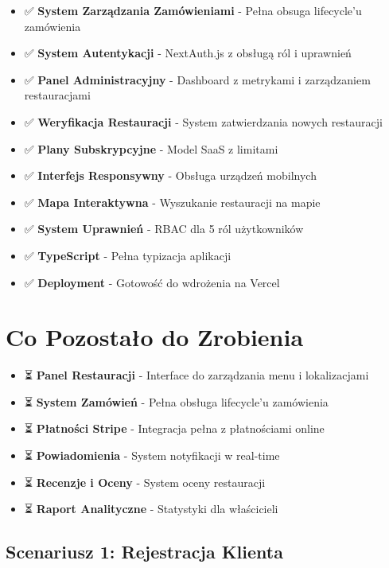 \documentclass[12pt,a4paper,utf-8]{article}
\begin{document}
\begin{itemize}
    \item ✅ \textbf{System Zarządzania Zamówieniami}  -  Pełna obsuga lifecycle'u zamówienia
    \item ✅ \textbf{System Autentykacji}  -  NextAuth.js z obsługą ról i uprawnień
    \item ✅ \textbf{Panel Administracyjny}  -  Dashboard z metrykami i zarządzaniem restauracjami
    \item ✅ \textbf{Weryfikacja Restauracji}  -  System zatwierdzania nowych restauracji
    \item ✅ \textbf{Plany Subskrypcyjne}  -  Model SaaS z limitami
    \item ✅ \textbf{Interfejs Responsywny}  -  Obsługa urządzeń mobilnych
    \item ✅ \textbf{Mapa Interaktywna}  -  Wyszukanie restauracji na mapie
    \item ✅ \textbf{System Uprawnień}  -  RBAC dla 5 ról użytkowników
    \item ✅ \textbf{TypeScript}  -  Pełna typizacja aplikacji
    \item ✅ \textbf{Deployment}  -  Gotowość do wdrożenia na Vercel
\end{itemize}

\section{Co Pozostało do Zrobienia}

\begin{itemize}
    \item ⏳ \textbf{Panel Restauracji}  -  Interface do zarządzania menu i lokalizacjami
    \item ⏳ \textbf{System Zamówień}  -  Pełna obsługa lifecycle'u zamówienia
    \item ⏳ \textbf{Płatności Stripe}  -  Integracja pełna z płatnościami online
    \item ⏳ \textbf{Powiadomienia}  -  System notyfikacji w real-time
    \item ⏳ \textbf{Recenzje i Oceny}  -  System oceny restauracji
    \item ⏳ \textbf{Raport Analityczne}  -  Statystyki dla właścicieli
\end{itemize}

\newpage

\subsection{Scenariusz 1: Rejestracja Klienta}
\end{document}
